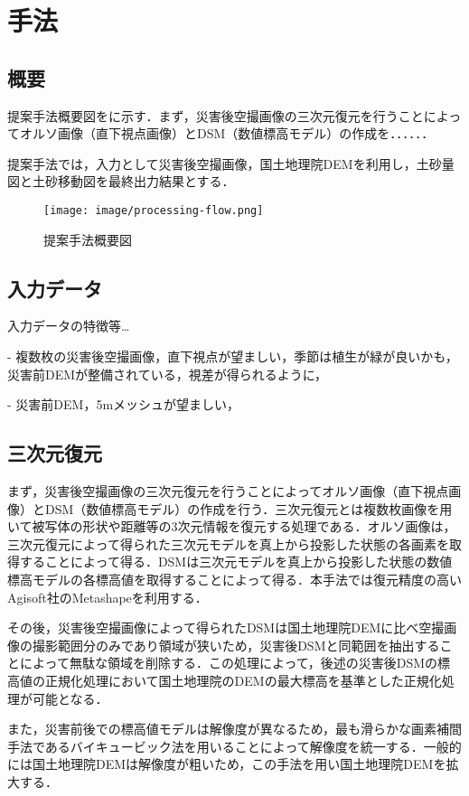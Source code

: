 \chapter{手法}
  \section{概要}
    提案手法概要図をに示す．まず，災害後空撮画像の三次元復元を行うことによってオルソ画像（直下視点画像）とDSM（数値標高モデル）の作成を．．．．．．

    提案手法では，入力として災害後空撮画像，国土地理院DEMを利用し，土砂量図と土砂移動図を最終出力結果とする．

    \begin{figure}[t]
      \centering
      \texttt{[image: image/processing-flow.png]}
      \caption{提案手法概要図}
      \label{提案手法概要図}
    \end{figure}


  \section{入力データ}
    入力データの特徴等\dots

    - 複数枚の災害後空撮画像，直下視点が望ましい，季節は植生が緑が良いかも，災害前DEMが整備されている，視差が得られるように，

    - 災害前DEM，5mメッシュが望ましい，



  \section{三次元復元}
    まず，災害後空撮画像の三次元復元を行うことによってオルソ画像（直下視点画像）とDSM（数値標高モデル）の作成を行う．三次元復元とは複数枚画像を用いて被写体の形状や距離等の3次元情報を復元する処理である．オルソ画像は，三次元復元によって得られた三次元モデルを真上から投影した状態の各画素を取得することによって得る．DSMは三次元モデルを真上から投影した状態の数値標高モデルの各標高値を取得することによって得る．本手法では復元精度の高いAgisoft社のMetashape\cite{使用手法1}を利用する．

    その後，災害後空撮画像によって得られたDSMは国土地理院DEMに比べ空撮画像の撮影範囲分のみであり領域が狭いため，災害後DSMと同範囲を抽出することによって無駄な領域を削除する．この処理によって，後述の災害後DSMの標高値の正規化処理において国土地理院のDEMの最大標高を基準とした正規化処理が可能となる．
  
    また，災害前後での標高値モデルは解像度が異なるため，最も滑らかな画素補間手法であるバイキュービック法\cite{論文手法1}を用いることによって解像度を統一する．一般的には国土地理院DEMは解像度が粗いため，この手法を用い国土地理院DEMを拡大する．

